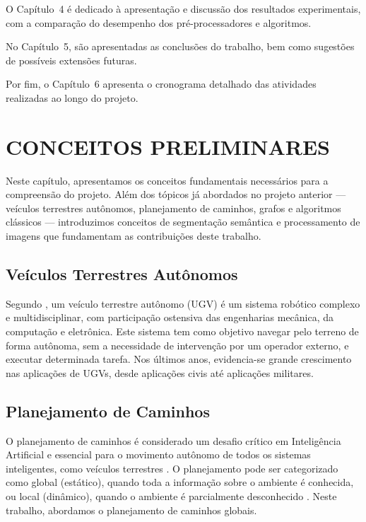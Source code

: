 \documentclass[
    12pt,
    openright,
    oneside,
    a4paper,
    english,
    brazil
]{abntex2}
\begin{document}
O Capítulo~4 é dedicado à apresentação e discussão dos resultados experimentais, com a comparação do desempenho dos pré-processadores e algoritmos.

No Capítulo~5, são apresentadas as conclusões do trabalho, bem como sugestões de possíveis extensões futuras.

Por fim, o Capítulo~6 apresenta o cronograma detalhado das atividades realizadas ao longo do projeto.

\chapter{CONCEITOS PRELIMINARES}

Neste capítulo, apresentamos os conceitos fundamentais necessários para a compreensão do projeto. Além dos tópicos já abordados no projeto anterior \cite{camelo2025} --- veículos terrestres autônomos, planejamento de caminhos, grafos e algoritmos clássicos --- introduzimos conceitos de segmentação semântica e processamento de imagens que fundamentam as contribuições deste trabalho.

\section{Veículos Terrestres Autônomos}

Segundo \cite{finn2010}, um veículo terrestre autônomo (UGV) é um sistema robótico complexo e multidisciplinar, com participação ostensiva das engenharias mecânica, da computação e eletrônica. Este sistema tem como objetivo navegar pelo terreno de forma autônoma, sem a necessidade de intervenção por um operador externo, e executar determinada tarefa. Nos últimos anos, evidencia-se grande crescimento nas aplicações de UGVs, desde aplicações civis até aplicações militares.

\section{Planejamento de Caminhos}

O planejamento de caminhos é considerado um desafio crítico em Inteligência Artificial e essencial para o movimento autônomo de todos os sistemas inteligentes, como veículos terrestres \cite{madridano2021}. O planejamento pode ser categorizado como global (estático), quando toda a informação sobre o ambiente é conhecida, ou local (dinâmico), quando o ambiente é parcialmente desconhecido \cite{chen2020}. Neste trabalho, abordamos o planejamento de caminhos globais.
\end{document}
